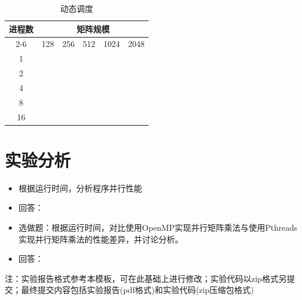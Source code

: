 \documentclass{SYSUReport}
\begin{document}
\begin{table}[H]
\centering
\caption{动态调度}
\label{表3}
\begin{tabular}{|c|lllll|}
\hline
\multirow{2}{*}{进程数} & \multicolumn{5}{c|}{矩阵规模}                                                                        \\ \cline{2-6} 
 & \multicolumn{1}{l|}{128} & \multicolumn{1}{l|}{256} & \multicolumn{1}{l|}{512} & \multicolumn{1}{l|}{1024} & 2048 \\ \hline
1                    & \multicolumn{1}{l|}{} & \multicolumn{1}{l|}{} & \multicolumn{1}{l|}{} & \multicolumn{1}{l|}{} &  \\ \hline
2                    & \multicolumn{1}{l|}{} & \multicolumn{1}{l|}{} & \multicolumn{1}{l|}{} & \multicolumn{1}{l|}{} &  \\ \hline
4                    & \multicolumn{1}{l|}{} & \multicolumn{1}{l|}{} & \multicolumn{1}{l|}{} & \multicolumn{1}{l|}{} &  \\ \hline
8                    & \multicolumn{1}{l|}{} & \multicolumn{1}{l|}{} & \multicolumn{1}{l|}{} & \multicolumn{1}{l|}{} &  \\ \hline
16                   & \multicolumn{1}{l|}{} & \multicolumn{1}{l|}{} & \multicolumn{1}{l|}{} & \multicolumn{1}{l|}{} &  \\ \hline
\end{tabular}
\end{table}
\section{实验分析}
\begin{itemize}
    \item 根据运行时间，分析程序并行性能
    \item 回答：
    \item 选做题：根据运行时间，对比使用OpenMP实现并行矩阵乘法与使用Pthreads实现并行矩阵乘法的性能差异，并讨论分析。
    \item 回答：
\end{itemize}
注：实验报告格式参考本模板，可在此基础上进行修改；实验代码以zip格式另提交；最终提交内容包括实验报告(pdf格式)和实验代码(zip压缩包格式)
\end{document}
